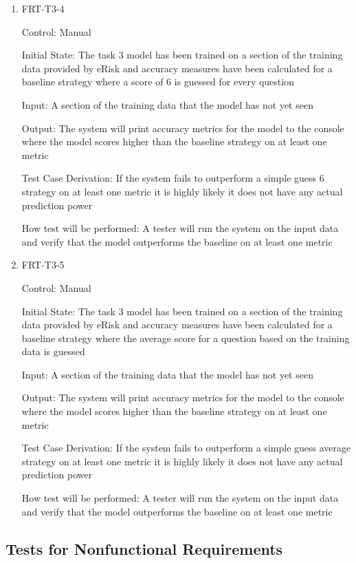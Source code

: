 \documentclass[12pt, titlepage]{article}
\begin{document}
\begin{enumerate}
\item{FRT-T3-4\\}

Control: Manual

Initial State: The task 3 model has been trained on a section of the training data provided by eRisk and accuracy measures have been calculated for a baseline strategy where a score of 6 is guessed for every question

Input: A section of the training data that the model has not yet seen

Output: The system will print accuracy metrics for the model to the console where the model scores higher than the baseline strategy on at least one metric

Test Case Derivation: If the system fails to outperform a simple guess 6 strategy on at least one metric it is highly likely it does not have any actual prediction power

How test will be performed: A tester will run the system on the input data and verify that the model outperforms the baseline on at least one metric

\item{FRT-T3-5\\}

Control: Manual

Initial State: The task 3 model has been trained on a section of the training data provided by eRisk and accuracy measures have been calculated for a baseline strategy where the average score for a question based on the training data is guessed

Input: A section of the training data that the model has not yet seen

Output: The system will print accuracy metrics for the model to the console where the model scores higher than the baseline strategy on at least one metric

Test Case Derivation: If the system fails to outperform a simple guess average strategy on at least one metric it is highly likely it does not have any actual prediction power

How test will be performed: A tester will run the system on the input data and verify that the model outperforms the baseline on at least one metric

\end{enumerate}

\subsection{Tests for Nonfunctional Requirements}
\end{document}
